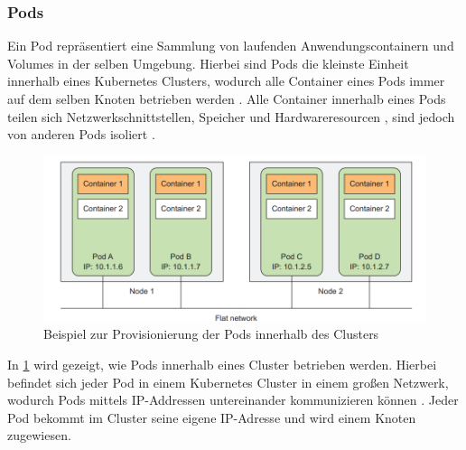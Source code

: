 \subsubsection{Pods}
\label{sec:kubernetes:pods}
Ein Pod repräsentiert eine Sammlung von laufenden Anwendungscontainern und Volumes in der selben Umgebung.
Hierbei sind Pods die kleinste Einheit innerhalb eines Kubernetes Clusters, wodurch alle Container eines Pods
immer auf dem selben Knoten betrieben werden \cite{Burns2019}.
Alle Container innerhalb eines Pods teilen sich Netzwerkschnittstellen, Speicher und Hardwareresourcen \cite{kubernetesPods},
sind jedoch von anderen Pods isoliert \cite{Burns2019}.

\begin{figure}[h]
  \includegraphics[width=\textwidth]{gfx/chapters/2_grundlagen/kubernetes_network.png}
  \caption{Beispiel zur Provisionierung der Pods innerhalb des Clusters}
  \label{fig:kubernetes_network}
\end{figure}

In \ref{fig:kubernetes_network} wird gezeigt, wie Pods innerhalb eines Cluster betrieben werden.
Hierbei befindet sich jeder Pod in einem Kubernetes Cluster in einem großen Netzwerk, wodurch Pods mittels IP-Addressen untereinander 
kommunizieren können \cite{Marko2018}. Jeder Pod bekommt im Cluster seine eigene IP-Adresse und wird einem Knoten zugewiesen.


